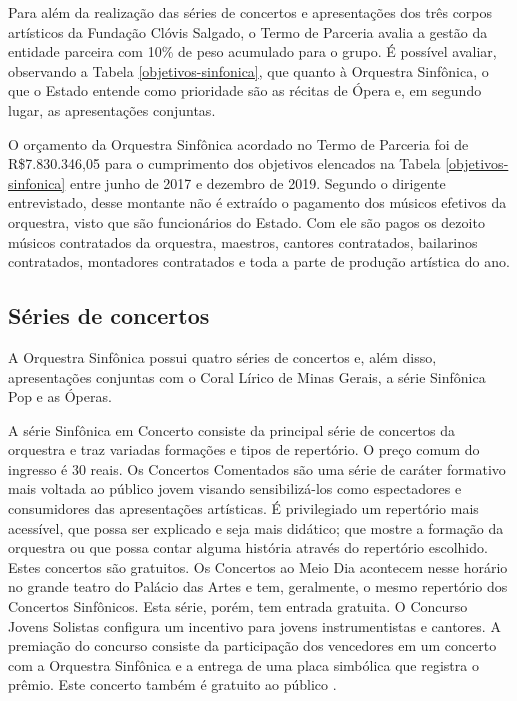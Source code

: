 \documentclass[a4paper, 12pt, openright, oneside, german, french, english, brazil]{abntex2}
\begin{document}
	Para além da realização das séries de concertos e apresentações dos três corpos artísticos da Fundação Clóvis Salgado, o Termo de Parceria avalia a gestão da entidade parceira com 10\% de peso acumulado para o grupo. É possível avaliar, observando  a Tabela \ref{objetivos-sinfonica}, que quanto à Orquestra Sinfônica, o que o Estado entende como prioridade são as récitas de Ópera e, em segundo lugar, as apresentações conjuntas.
	
	
	O orçamento da Orquestra Sinfônica acordado no Termo de Parceria foi de R\$7.830.346,05 para o cumprimento dos objetivos elencados na Tabela \ref{objetivos-sinfonica}\cite{appa2017parceria} entre junho de 2017 e dezembro de 2019. Segundo o dirigente entrevistado, desse montante não é extraído o pagamento dos músicos efetivos da orquestra, visto que são funcionários do Estado. Com ele são pagos os dezoito músicos contratados da orquestra, maestros, cantores contratados, bailarinos contratados, montadores contratados e toda a parte de produção artística do ano.  
	
	\subsection{Séries de concertos}
	
	A Orquestra Sinfônica possui quatro séries de concertos e, além disso, apresentações conjuntas com o Coral Lírico de Minas Gerais, a série Sinfônica Pop e as Óperas.
	
	A série Sinfônica em Concerto consiste da principal série de concertos da orquestra e traz variadas formações e tipos de repertório. O preço comum do ingresso é 30 reais. Os Concertos Comentados são uma série de caráter formativo mais voltada ao público jovem visando sensibilizá-los como espectadores e consumidores das apresentações artísticas. É privilegiado um repertório mais acessível, que possa ser explicado e seja mais didático; que mostre a formação da orquestra ou que possa contar alguma história através do repertório escolhido. Estes concertos são gratuitos. Os Concertos ao Meio Dia acontecem nesse horário no grande teatro do Palácio das Artes e tem, geralmente, o mesmo repertório dos Concertos Sinfônicos. Esta série, porém, tem entrada gratuita. O Concurso Jovens Solistas configura um incentivo para jovens instrumentistas e cantores. A premiação do concurso consiste da participação dos vencedores em um concerto com a Orquestra Sinfônica e a entrega de uma placa simbólica que registra o prêmio. Este concerto também é gratuito ao público \cite{appa2017parceria}.
	
\end{document}
